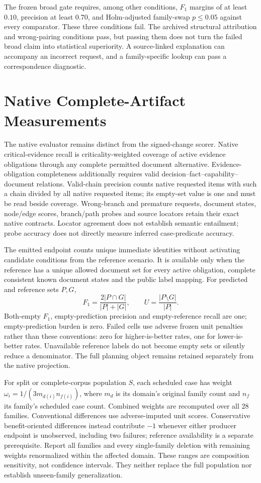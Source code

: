 The frozen broad gate requires, among other conditions, $F_1$ margins of
at least $0.10$, precision at least $0.70$, and Holm-adjusted family-swap
$p\le0.05$ against every comparator. These three conditions fail. The
archived structural attribution and wrong-pairing conditions pass, but
passing them does not turn the failed broad claim into statistical
superiority. A source-linked explanation can accompany an incorrect
request, and a family-specific lookup can pass a correspondence diagnostic.

\section{Native Complete-Artifact Measurements}
\label{app:native-metrics}

The native evaluator remains distinct from the signed-change scorer.
Native critical-evidence recall is criticality-weighted coverage of active
evidence obligations through any complete permitted document alternative.
Evidence-obligation completeness additionally requires valid
 decision--fact--capability--document relations. Valid-chain precision
counts native requested items with such a chain divided by all native
requested items; its empty-set value is one and must be read beside
coverage. Wrong-branch and premature requests, document states, node/edge
scores, branch/path probes and source locators retain their exact native
contracts. Locator agreement does not establish semantic entailment;
probe accuracy does not directly measure inferred case-predicate accuracy.

The emitted endpoint counts unique immediate identities without activating
candidate conditions from the reference scenario. It is available only
when the reference has a unique allowed document set for every active
obligation, complete consistent known document states and the public label
mapping. For predicted and reference sets $P,G$,
\[
F_1=\frac{2|P\cap G|}{|P|+|G|},\qquad U=\frac{|P\setminus G|}{|P|}.
\]
Both-empty $F_1$, empty-prediction precision and empty-reference recall
are one; empty-prediction burden is zero. Failed cells use adverse frozen
unit penalties rather than these conventions: zero for higher-is-better
rates, one for lower-is-better rates. Unavailable reference labels do not
become empty sets or silently reduce a denominator. The full planning
object remains retained separately from the native projection.

For split or complete-corpus population $S$, each scheduled case has weight
$\omega_i=1/(3m_{d(i)}n_{f(i)})$, where $m_d$ is its domain's original family
count and $n_f$ its family's scheduled case count. Combined weights are
recomputed over all 28 families. Conventional differences use
adverse-imputed unit scores. Conservative benefit-oriented differences
instead contribute $-1$ whenever either producer endpoint is unobserved,
including two failures; reference availability is a separate prerequisite.
Report all families and every single-family deletion with remaining weights
renormalized within the affected domain. These ranges are composition
sensitivity, not confidence intervals. They neither replace the full
population nor establish unseen-family generalization.
